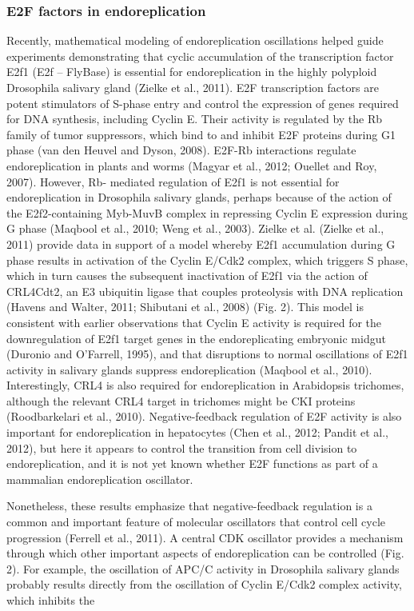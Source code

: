 \documentclass[11pt,twoside,a4paper]{report}
\begin{document}
			\subsubsection{E2F factors in endoreplication}
			
			Recently, mathematical modeling of endoreplication oscillations helped guide experiments demonstrating that cyclic accumulation of the transcription factor E2f1 (E2f – FlyBase) is essential for endoreplication in the highly polyploid Drosophila salivary gland (Zielke et al., 2011). E2F transcription factors are potent stimulators of S-phase entry and control the expression of genes required for DNA synthesis, including Cyclin E. Their activity is regulated by the Rb family of tumor suppressors, which bind to and inhibit E2F proteins during G1 phase (van den Heuvel and Dyson, 2008). E2F-Rb interactions regulate endoreplication in plants and worms (Magyar et al., 2012; Ouellet and Roy, 2007). However, Rb- mediated regulation of E2f1 is not essential for endoreplication in Drosophila salivary glands, perhaps because of the action of the E2f2-containing Myb-MuvB complex in repressing Cyclin E expression during G phase (Maqbool et al., 2010; Weng et al., 2003). Zielke et al. (Zielke et al., 2011) provide data in support of a model whereby E2f1 accumulation during G phase results in activation of the Cyclin E/Cdk2 complex, which triggers S phase, which in turn causes the subsequent inactivation of E2f1 via the action of CRL4Cdt2, an E3 ubiquitin ligase that couples proteolysis with DNA replication (Havens and Walter, 2011; Shibutani et al., 2008) (Fig. 2). This model is consistent with earlier observations that Cyclin E activity is required for the downregulation of E2f1 target genes in the endoreplicating embryonic midgut (Duronio and O’Farrell, 1995), and that disruptions to normal oscillations of E2f1 activity in salivary glands suppress endoreplication (Maqbool et al., 2010). Interestingly, CRL4 is also required for endoreplication in Arabidopsis trichomes, although the relevant CRL4 target in trichomes might be CKI proteins (Roodbarkelari et al., 2010). Negative-feedback regulation of E2F activity is also important for endoreplication in hepatocytes (Chen et al., 2012; Pandit et al., 2012), but here it appears to control the transition from cell division to endoreplication, and it is not yet known whether E2F functions as part of a mammalian endoreplication oscillator. 
			
			
			Nonetheless, these results emphasize that negative-feedback regulation is a common and important feature of molecular oscillators that control cell cycle progression (Ferrell et al., 2011). A central CDK oscillator provides a mechanism through which other important aspects of endoreplication can be controlled (Fig. 2). For example, the oscillation of APC/C activity in Drosophila salivary glands probably results directly from the oscillation of Cyclin E/Cdk2 complex activity, which inhibits the
		
\end{document}

